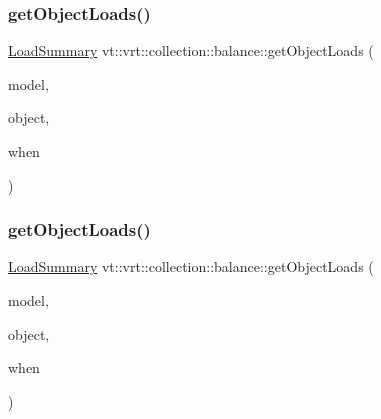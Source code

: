 \mbox{\label{namespacevt_1_1vrt_1_1collection_1_1balance_ae3bc5e1c68d2f55908748501fcba9146}} 
\subsubsection{\texorpdfstring{get\+Object\+Loads()}{getObjectLoads()}\hspace{0.1cm}{\footnotesize\ttfamily [1/2]}}
{\footnotesize\ttfamily \hyperlink{structvt_1_1vrt_1_1collection_1_1balance_1_1_load_summary}{Load\+Summary} vt\+::vrt\+::collection\+::balance\+::get\+Object\+Loads (\begin{DoxyParamCaption}\item[{std\+::shared\+\_\+ptr$<$ \hyperlink{structvt_1_1vrt_1_1collection_1_1balance_1_1_load_model}{Load\+Model} $>$}]{model,  }\item[{\hyperlink{structvt_1_1vrt_1_1collection_1_1balance_1_1_element_i_d_struct}{Element\+I\+D\+Struct}}]{object,  }\item[{\hyperlink{structvt_1_1vrt_1_1collection_1_1balance_1_1_phase_offset}{Phase\+Offset}}]{when }\end{DoxyParamCaption})}

\mbox{\label{namespacevt_1_1vrt_1_1collection_1_1balance_a5e4d4bdd2fceaebcb89d669b8a1b2361}} 
\subsubsection{\texorpdfstring{get\+Object\+Loads()}{getObjectLoads()}\hspace{0.1cm}{\footnotesize\ttfamily [2/2]}}
{\footnotesize\ttfamily \hyperlink{structvt_1_1vrt_1_1collection_1_1balance_1_1_load_summary}{Load\+Summary} vt\+::vrt\+::collection\+::balance\+::get\+Object\+Loads (\begin{DoxyParamCaption}\item[{\hyperlink{structvt_1_1vrt_1_1collection_1_1balance_1_1_load_model}{Load\+Model} $\ast$}]{model,  }\item[{\hyperlink{structvt_1_1vrt_1_1collection_1_1balance_1_1_element_i_d_struct}{Element\+I\+D\+Struct}}]{object,  }\item[{\hyperlink{structvt_1_1vrt_1_1collection_1_1balance_1_1_phase_offset}{Phase\+Offset}}]{when }\end{DoxyParamCaption})}

